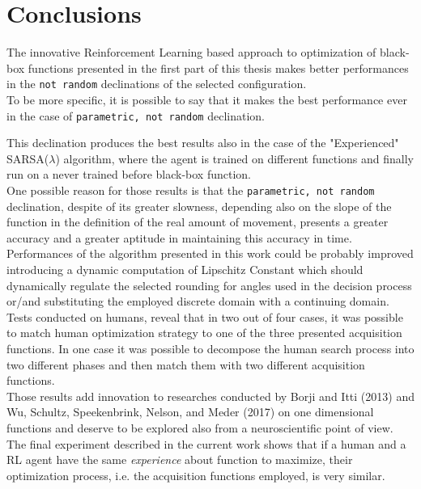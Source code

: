 \chapter{Conclusions}

The innovative Reinforcement Learning based approach to optimization of black-box functions presented in the first part of this thesis makes better performances in the {\tt not random} declinations of the selected configuration. \\

To be more specific, it is possible to say that it makes the best performance ever in the case of {\tt parametric, not random} declination.

This declination produces the best results also in the case of the "Experienced" SARSA($\lambda$) algorithm, where the agent is trained on different functions and finally run on a never trained before black-box function. \\

One possible reason for those results is that the {\tt parametric, not random} declination, despite of its greater slowness, depending also on the slope of the function in the definition of the real amount of movement, presents a greater accuracy and a greater aptitude in maintaining this accuracy in time. \\

Performances of the algorithm presented in this work could be probably improved introducing a dynamic computation of Lipschitz Constant which should dynamically regulate the selected rounding for angles used in the decision process or/and substituting the employed discrete domain with a continuing domain. \\

Tests conducted on humans, reveal that in two out of four cases, it was possible to match human optimization strategy to one of the three presented acquisition functions. In one case it was possible to decompose the human search process into two different phases and then match them with two different acquisition functions. \\

Those results add innovation to researches conducted by Borji and Itti (2013) and Wu, Schultz, Speekenbrink, Nelson, and Meder (2017) on one dimensional functions and deserve to be explored also from a neuroscientific point of view. \\

The final experiment described in the current work shows that if a human and a RL agent have the same \textit{experience} about function to maximize, their optimization process, i.e. the acquisition functions employed, is very similar.




